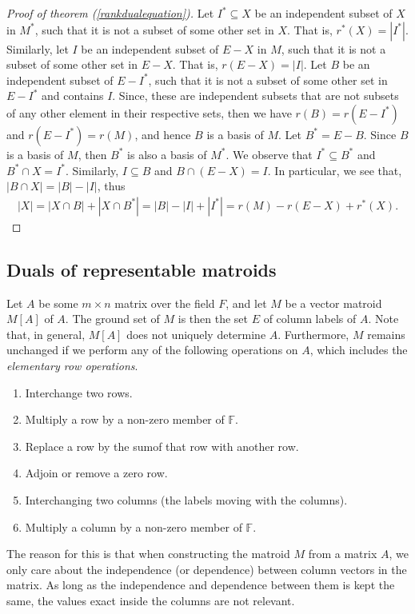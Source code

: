 \begin{proof}[Proof of theorem (\ref{rankdualequation})]
    Let $I^* \subseteq X$ be an independent subset of $X$ in $M^*$, such that it is not a subset of some other set in $X$. That is, $r^*(X)=|I^*|$. Similarly, let $I$ be an independent subset of $E-X$ in $M$, such that it is not a subset of some other set in $E-X$. That is, $r(E-X)=|I|$. Let $B$ be an independent subset of $E-I^*$, such that it is not a subset of some other set in $E-I^*$ and contains $I$. Since, these are independent subsets that are not subsets of any other element in their respective sets, then we have $r(B)=r(E-I^*)$ and $r(E-I^*)=r(M)$, and hence $B$ is a basis of $M$.
    Let $B^*=E-B$. Since $B$ is a basis of $M$, then $B ^* $ is also a basis of $M^*$. We observe that $I^*\subseteq B^*$ and  $B^*\cap X=I^*$. Similarly, $I\subseteq B$ and  $B\cap (E-X)=I$. In particular, we see that, $|B\cap X|=|B|-|I|$, thus
    \begin{align*}
    |X|=|X\cap B|+|X\cap B^*|=|B|-|I|+|I^*|=r(M)-r(E-X)+r^*(X).
    \end{align*}
\end{proof}

\newpage
\subsection{Duals of representable matroids}

Let $A$ be some $m \times n$ matrix over the field $F$, and let $M$ be a vector matroid $M[A]$ of $A$. The ground set of $M$ is then the set $E$ of column labels of $A$. Note that, in general, $M[A]$ does not uniquely determine $A$. Furthermore, $M$ remains unchanged if we perform any of the following operations on $A$, which includes the \textit{elementary row operations}.
\begin{enumerate}
    \item Interchange two rows.
    \item Multiply a row by a non-zero member of $\mathbb{F}$.
    \item Replace a row by the sumof that row with another row.
    \item Adjoin or remove a zero row.
    \item Interchanging two columns (the labels moving with the columns).
    \item Multiply a column by a non-zero member of $\mathbb{F}$.
\end{enumerate}

The reason for this is that when constructing the matroid $M$ from a matrix $A$, we only care about the independence (or dependence) between column vectors in the matrix. As long as the independence and dependence between them is kept the same, the values exact inside the columns are not relevant.

